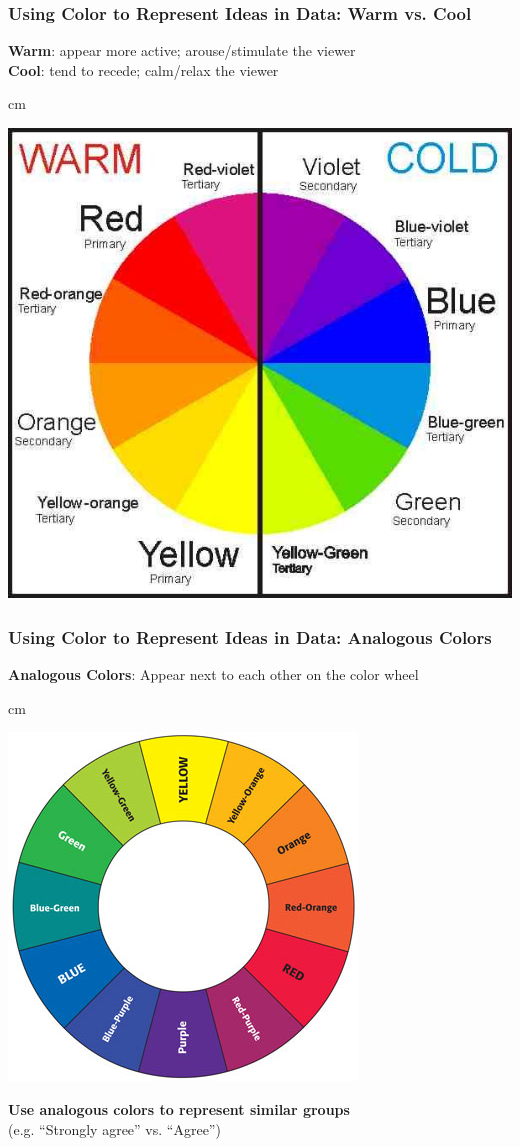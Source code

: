 \documentclass{beamer} %
\begin{document}
\begin{frame}\frametitle{Using Color to Represent Ideas in Data:  Warm vs. Cool}
	\centering
	
	\textbf{Warm}:  appear more active; arouse/stimulate the viewer\\
	\textbf{Cool}:  tend to recede; calm/relax the viewer
	
	 cm
	
	\includegraphics[width=0.66\linewidth]{warmcold}
	
\end{frame}


\begin{frame}\frametitle{Using Color to Represent Ideas in Data:  Analogous Colors}
	\centering
	
	\textbf{Analogous Colors}:  Appear next to each other on the color wheel
	
	 cm
	
	\includegraphics[width=0.6\linewidth]{colorwheel2}
	
	\textbf{Use analogous colors to represent similar groups} \\(e.g. ``Strongly agree'' vs. ``Agree'')
	
\end{frame}
\end{document}
